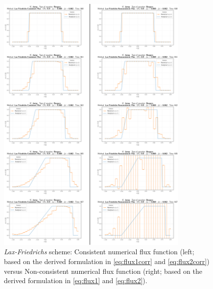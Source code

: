 \begin{figure}[ht]
	\includegraphics[width=0.84\textwidth]{LFconsistency.eps}
	\caption{\emph{Lax-Friedrichs} scheme:
		Consistent numerical flux function
		(left; based on the derived formulation in \eqref{eq:flux1corr} and \eqref{eq:flux2corr})
		versus Non-consistent numerical flux function
		(right; based on the derived formulation in \eqref{eq:flux1} and \eqref{eq:flux2}).}
	\label{\LABEL}
\end{figure}
